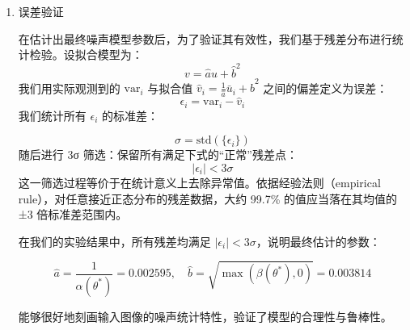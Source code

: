 \documentclass[a4paper]{article}
\begin{document}
\begin{enumerate}
\begin{adjustwidth}{2em}{}
	    \end{adjustwidth}
		\paragraph{角度搜索与终止条件}
		\begin{adjustwidth}{2em}{}
		设置角度搜索区间为 $[0^\circ, 90^\circ]$，以 1 度或二分法方式搜索。
		对每个角度：
		\begin{itemize}
		\item 将原始点集按该角度旋转。
		\item 使用 RANSAC 拟合出直线模型 $v' = \alpha u' + \beta$。
		\item 计算斜率误差 $\Delta a = |\alpha - 1/a_{\text{eva}}|$。
		\end{itemize}
		当满足以下两个条件时停止：
		\begin{itemize}
		\item $\Delta a < 10^{-5}$：表示拟合的斜率与理论值足够接近；
		\item $\beta > 0$：确保高斯噪声方差合法（不能为负）。
		\end{itemize}
		若无满足条件的角度，选择误差最小的角度对应结果。
		\end{adjustwidth}
		最终我们得到：\par
		最优旋转角度：$ \theta^* $；\par
		最终模型参数估计：\par
		$$
			\hat{a} = \frac{1}{\alpha(\theta^*)}, \quad \hat{b} = \sqrt{\max(\beta(\theta^*), 0)}
		$$

       	\item 误差验证\par 
		\hspace{2em}在估计出最终噪声模型参数后，为了验证其有效性，我们基于残差分布进行统计检验。设拟合模型为：
		$$
			v = \hat{a} u + \hat{b}^2
		$$
		\hspace{2em}我们用实际观测到的 $\mathrm{var}_i$ 与拟合值 $\hat{v}_i = \frac{1}{\hat{a}} \bar u_i + \hat{b}^2$ 之间的偏差定义为误差：
		$$
			\epsilon_i = \mathrm{var}_i - \hat{v}_i
		$$
		\hspace{2em}我们统计所有 $\epsilon_i$ 的标准差：\par
		$$
			\sigma = \mathrm{std}(\{\epsilon_i\})
		$$
		\hspace{2em}随后进行 3σ 筛选：保留所有满足下式的“正常”残差点：
       	$$
			|\epsilon_i| < 3\sigma
		$$
		\hspace{2em}这一筛选过程等价于在统计意义上去除异常值。依据经验法则（empirical rule），对任意接近正态分布的残差数据，大约 99.7\% 的值应当落在其均值的 ±3 倍标准差范围内。\par

        \hspace{2em}在我们的实验结果中，所有残差均满足 $|\epsilon_i| < 3\sigma$，说明最终估计的参数：

		$$
			\hat{a} = \frac{1}{\alpha(\theta^*)}=0.002595, \quad \hat{b} = \sqrt{\max(\beta(\theta^*), 0)}=0.003814
		$$

		能够很好地刻画输入图像的噪声统计特性，验证了模型的合理性与鲁棒性。
    \end{enumerate}
	
\end{document}
